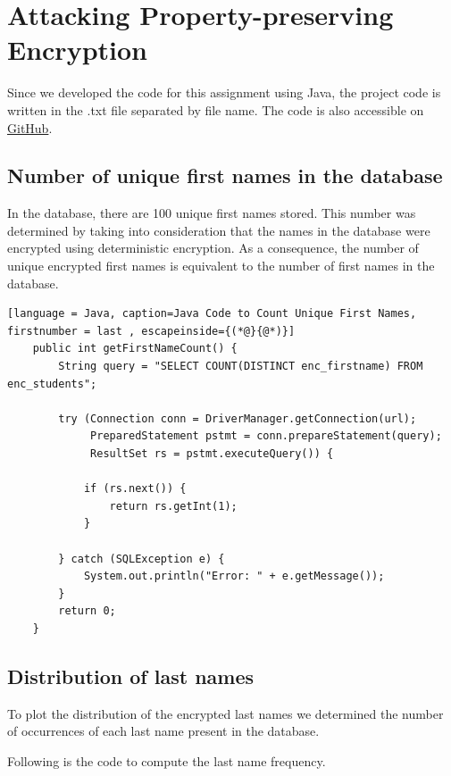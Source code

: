 \section{Attacking Property-preserving Encryption}


Since we developed the code for this assignment using Java, the project code is written in the .txt file separated by file name. The code is also accessible on \href{https://github.com/lallo-unitn/secure_cloud_assignment2/tree/main/cryptoDB/cryptodbProject/src/main/java/nl/ut/eemcs/cloudsec}{GitHub}.

\subsection{Number of unique first names in the database}

In the database, there are 100 unique first names stored. This number was determined by taking into consideration that the names in the database were encrypted using deterministic encryption. As a consequence, the number of unique encrypted first names is equivalent to the number of first names in the database.

\begin{lstlisting}[language = Java, caption=Java Code to Count Unique First Names, firstnumber = last , escapeinside={(*@}{@*)}]
    public int getFirstNameCount() {
        String query = "SELECT COUNT(DISTINCT enc_firstname) FROM enc_students";
    
        try (Connection conn = DriverManager.getConnection(url);
             PreparedStatement pstmt = conn.prepareStatement(query);
             ResultSet rs = pstmt.executeQuery()) {
    
            if (rs.next()) {
                return rs.getInt(1);
            }
    
        } catch (SQLException e) {
            System.out.println("Error: " + e.getMessage());
        }
        return 0;
    }
\end{lstlisting}

\newpage

\subsection{Distribution of last names}

To plot the distribution of the encrypted last names we determined the number of occurrences of each last name present in the database.

Following is the code to compute the last name frequency.

